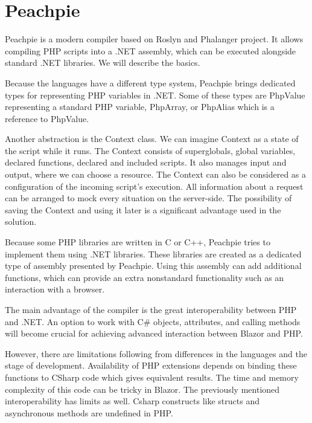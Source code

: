 \section{Peachpie}

Peachpie  is a modern compiler based on Roslyn and Phalanger project.
It allows compiling PHP scripts into a .NET assembly, which can be executed alongside standard .NET libraries.
We will describe the basics.
\par
Because the languages have a different type system, Peachpie brings dedicated types for representing PHP variables in .NET.
Some of these types are PhpValue representing a standard PHP variable, PhpArray, or PhpAlias which is a reference to PhpValue.
\par
Another abstraction is the Context class.
We can imagine Context as a state of the script while it runs.
The Context consists of superglobals, global variables, declared functions, declared and included scripts.
It also manages input and output, where we can choose a resource.
The Context can also be considered as a configuration of the incoming script's execution.
All information about a request can be arranged to mock every situation on the server-side.
The possibility of saving the Context and using it later is a significant advantage used in the solution.
\par
{}
Because some PHP libraries are written in C or C++, Peachpie tries to implement them using .NET libraries.
These libraries are created as a dedicated type of assembly presented by Peachpie.
Using this assembly can add additional functions, which can provide an extra nonstandard functionality such as an interaction with a browser.
\par
{}
The main advantage of the compiler is the great interoperability between PHP and .NET.
An option to work with C\# objects, attributes, and calling methods will become crucial for achieving advanced interaction between Blazor and PHP.
\par
However, there are limitations following from differences in the languages and the stage of development.
Availability of PHP extensions depends on binding these functions to CSharp code which gives equivalent results. 
The time and memory complexity of this code can be tricky in Blazor.
The previously mentioned interoperability has limits as well.
Csharp constructs like structs and asynchronous methods are undefined in PHP.
